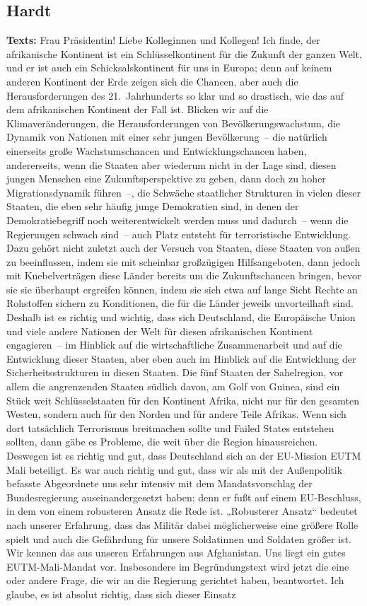 \documentclass{article}
\begin{document}
\subsection{Hardt}
\noindent\textbf{Texts:} Frau Präsidentin! Liebe Kolleginnen und Kollegen! Ich finde, der afrikanische Kontinent ist ein Schlüsselkontinent für die Zukunft der ganzen Welt, und er ist auch ein Schicksalskontinent für uns in Europa; denn auf keinem anderen Kontinent der Erde zeigen sich die Chancen, aber auch die Herausforderungen des 21. Jahrhunderts so klar und so drastisch, wie das auf dem afrikanischen Kontinent der Fall ist. Blicken wir auf die Klimaveränderungen, die Herausforderungen von Bevölkerungswachstum, die Dynamik von Nationen mit einer sehr jungen Bevölkerung – die natürlich einerseits große Wachstumschancen und Entwicklungschancen haben, andererseits, wenn die Staaten aber wiederum nicht in der Lage sind, diesen jungen Menschen eine Zukunftsperspektive zu geben, dann doch zu hoher Migrationsdynamik führen –, die Schwäche staatlicher Strukturen in vielen dieser Staaten, die eben sehr häufig junge Demokratien sind, in denen der Demokratiebegriff noch weiterentwickelt werden muss und dadurch – wenn die Regierungen schwach sind – auch Platz entsteht für terroristische Entwicklung. Dazu gehört nicht zuletzt auch der Versuch von Staaten, diese Staaten von außen zu beeinflussen, indem sie mit scheinbar großzügigen Hilfsangeboten, dann jedoch mit Knebelverträgen diese Länder bereits um die Zukunftschancen bringen, bevor sie sie überhaupt ergreifen können, indem sie sich etwa auf lange Sicht Rechte an Rohstoffen sichern zu Konditionen, die für die Länder jeweils unvorteilhaft sind. Deshalb ist es richtig und wichtig, dass sich Deutschland, die Europäische Union und viele andere Nationen der Welt für diesen afrikanischen Kontinent engagieren – im Hinblick auf die wirtschaftliche Zusammenarbeit und auf die Entwicklung dieser Staaten, aber eben auch im Hinblick auf die Entwicklung der Sicherheitsstrukturen in diesen Staaten. Die fünf Staaten der Sahelregion, vor allem die angrenzenden Staaten südlich davon, am Golf von Guinea, sind ein Stück weit Schlüsselstaaten für den Kontinent Afrika, nicht nur für den gesamten Westen, sondern auch für den Norden und für andere Teile Afrikas. Wenn sich dort tatsächlich Terrorismus breitmachen sollte und Failed States entstehen sollten, dann gäbe es Probleme, die weit über die Region hinausreichen. Deswegen ist es richtig und gut, dass Deutschland sich an der EU-Mission EUTM Mali beteiligt. Es war auch richtig und gut, dass wir als mit der Außenpolitik befasste Abgeordnete uns sehr intensiv mit dem Mandatsvorschlag der Bundesregierung auseinandergesetzt haben; denn er fußt auf einem EU-Beschluss, in dem von einem robusteren Ansatz die Rede ist. „Robusterer Ansatz“ bedeutet nach unserer Erfahrung, dass das Militär dabei möglicherweise eine größere Rolle spielt und auch die Gefährdung für unsere Soldatinnen und Soldaten größer ist. Wir kennen das aus unseren Erfahrungen aus Afghanistan. Uns liegt ein gutes EUTM-Mali-Mandat vor. Insbesondere im Begründungstext wird jetzt die eine oder andere Frage, die wir an die Regierung gerichtet haben, beantwortet. Ich glaube, es ist absolut richtig, dass sich dieser Einsatz 
\end{document}
